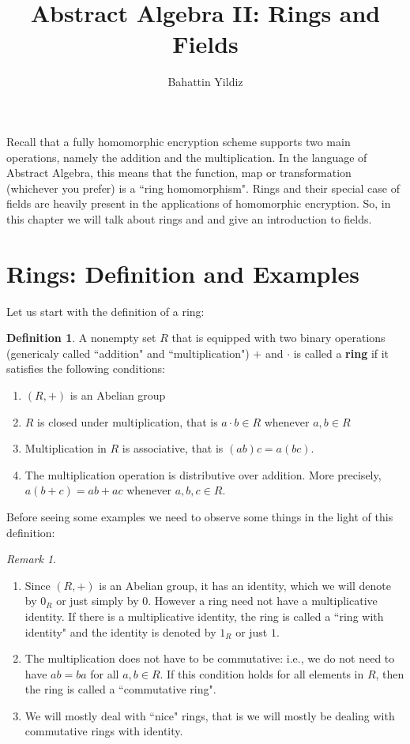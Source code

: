 \documentclass[12pt]{article}
\title{Abstract Algebra II: Rings and Fields}
\author{Bahattin Yildiz }
\date{}
\theoremstyle{plain}
\theoremstyle{definition}
\newtheorem{definition}{Definition}
\theoremstyle{remark}
\newtheorem{remark}{Remark}
\begin{document}
\maketitle

Recall that a fully homomorphic encryption scheme supports two main operations, namely the addition and the multiplication. In the language of Abstract Algebra, this means that the function, map or transformation (whichever you prefer) is a ``ring homomorphism". Rings and their special case of fields are heavily present in the applications of homomorphic encryption. So, in this chapter we will talk about rings and and give an introduction to fields.
\section{Rings: Definition and Examples}
Let us start with the definition of a ring:
\begin{definition}
A nonempty set $R$ that is equipped with two binary operations (genericaly called ``addition" and ``multiplication") $+$ and $\cdot$ is called a {\bf ring} if it satisfies the following conditions:
\begin{enumerate}
    \item $(R,+)$ is an Abelian group
 \item $R$ is closed under multiplication, that is $a\cdot b \in R$ whenever $a,b\in R$
 \item Multiplication in $R$ is associative, that is $(ab)c=a(bc)$.
 \item The multiplication operation is distributive over addition. More precisely, $a(b+c)=ab+ac$ whenever $a, b, c \in R$.
\end{enumerate}
\end{definition}
Before seeing some examples we need to observe some things in the light of this definition:
\begin{remark}
\begin{enumerate}
    \item Since $(R,+)$ is an Abelian group, it has an identity, which we will denote by $0_R$ or just simply by $0$. However a ring need not have a multiplicative identity. If there is a multiplicative identity, the ring is called a ``ring with identity" and the identity is denoted by $1_R$ or just $1$.
    \item The multiplication does not have to be commutative: i.e., we do not need to have $ab=ba$ for all $a,b \in R$. If this condition holds for all elements in $R$, then the ring is called a ``commutative ring".
    \item We will mostly deal with ``nice" rings, that is we will mostly be dealing with commutative rings with identity.
\end{enumerate}
\end{remark}
\end{document}
